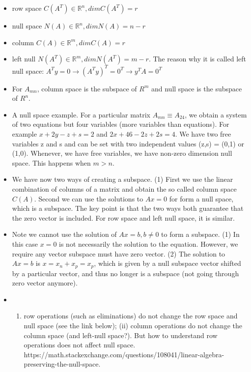 \documentclass[11pt]{article}
\providecommand{\tightlist}{%
      \setlength{\itemsep}{0pt}\setlength{\parskip}{0pt}}
\begin{document}
\begin{itemize}
\item
  row space \(C(A^T) \in \mathbb{R}^n, dim C(A^T)=r\)
\item
  null space \(N(A) \in \mathbb{R}^n, dim N(A)=n-r\)
\item
  column \(C(A) \in \mathbb{R}^m, dim C(A)=r\)
\item
  left null \(N(A^T) \in \mathbb{R}^m, dim N(A^T)=m-r\). The reason why
  it is called left null space:
  \(A^Ty=0 \rightarrow (A^Ty)^T=0^T\rightarrow y^TA=0^T\)
\item
  For \(A_{mn}\), column space is the subspace of \(R^{m}\) and null
  space is the subspace of \(R^{n}\).
\item
  A null space example. For a particular matrix
  \(A_{mn} \equiv A_{24}\), we obtain a system of two equations but four
  variables (more variables than equations). For example
  \(x+2y-z+s = 2\) and \(2x+46-2z+2s = 4\). We have two free variables z
  and s and can be set with two independent values (z,s) = (0,1) or
  (1,0). Whenever, we have free variables, we have non-zero dimension
  null space. This happens when \(m>n\).
\item
  We have now two ways of creating a subspace. (1) First we use the
  linear combination of columns of a matrix and obtain the so called
  column space \(C(A)\). Second we can use the solutions to \(Ax = 0\)
  for form a null space, which is a subspace. The key point is that the
  two ways both guarantee that the zero vector is included. For row
  space and left null space, it is similar.
\item
  Note we cannot use the solution of \(Ax = b, b\neq 0\) to form a
  subspace. (1) In this case \(x=0\) is not necessarily the solution to
  the equation. However, we require any vector subspace must have zero
  vector. (2) The solution to \(Ax = b\) is \(x=x_{n}+x_{p} = x_{p}\),
  which is given by a null subspace vector shifted by a particular
  vector, and thus no longer is a subspace (not going through zero
  vector anymore).
\item
  \begin{enumerate}
  \def\labelenumi{(\roman{enumi})}
  \tightlist
  \item
    row operations (such as eliminations) do not change the row space
    and null space (see the link below); (ii) column operations do not
    change the column space (and left-null space?). But how to
    understand row operations does not affect null space.
    https://math.stackexchange.com/questions/108041/linear-algebra-preserving-the-null-space.\\

\end{enumerate}
\end{itemize}
\end{document}
